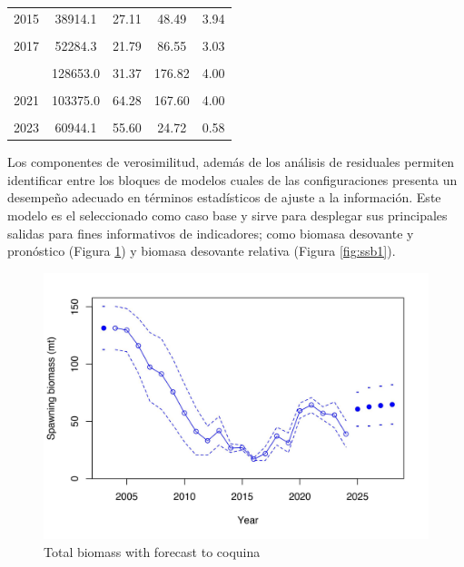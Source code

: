 \documentclass[
]{article}
\begin{document}
\begin{table}[ht!]
\begin{tabular}[t]{ccccc}
2015 & 38914.1 & 27.11 & 48.49 & 3.94\\
\cellcolor{gray!6}{2016} & \cellcolor{gray!6}{58124.2} & \cellcolor{gray!6}{17.08} & \cellcolor{gray!6}{34.99} & \cellcolor{gray!6}{1.57}\\
2017 & 52284.3 & 21.79 & 86.55 & 3.03\\
\cellcolor{gray!6}{2018} & \cellcolor{gray!6}{119431.0} & \cellcolor{gray!6}{37.18} & \cellcolor{gray!6}{72.14} & \cellcolor{gray!6}{2.85}\\
\addlinespace
2019 & 128653.0 & 31.37 & 176.82 & 4.00\\
\cellcolor{gray!6}{2020} & \cellcolor{gray!6}{111082.0} & \cellcolor{gray!6}{59.33} & \cellcolor{gray!6}{191.15} & \cellcolor{gray!6}{4.00}\\
2021 & 103375.0 & 64.28 & 167.60 & 4.00\\
\cellcolor{gray!6}{2022} & \cellcolor{gray!6}{46126.8} & \cellcolor{gray!6}{56.98} & \cellcolor{gray!6}{135.34} & \cellcolor{gray!6}{2.91}\\
2023 & 60944.1 & 55.60 & 24.72 & 0.58\\
\bottomrule
\end{tabular}
\end{table}

Los componentes de verosimilitud, además de los análisis de residuales permiten identificar entre los bloques de modelos cuales de las configuraciones presenta un desempeño adecuado en términos estadísticos de ajuste a la información. Este modelo es el seleccionado como caso base y sirve para desplegar sus principales salidas para fines informativos de indicadores; como biomasa desovante y pronóstico (Figura \ref{fig:ssb}) y biomasa desovante relativa (Figura \ref{fig:ssb1}).

\begin{figure}[H]

{\centering \includegraphics[width=0.8\linewidth]{Dtrunculus_SS3_2024_files/figure-latex/ssb-1} 

}

\caption{\label{fig:ssb}Total biomass with forecast to coquina}\label{fig:ssb}
\end{figure}
\end{document}
